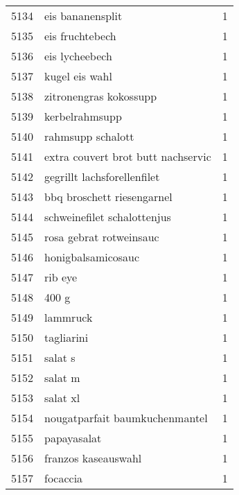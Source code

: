 \begin{tabular}{llr}
5134 &                                   eis bananensplit &      1 \\
5135 &                                    eis fruchtebech &      1 \\
5136 &                                     eis lycheebech &      1 \\
5137 &                                     kugel eis wahl &      1 \\
5138 &                             zitronengras kokossupp &      1 \\
5139 &                                     kerbelrahmsupp &      1 \\
5140 &                                  rahmsupp schalott &      1 \\
5141 &                 extra couvert brot butt nachservic &      1 \\
5142 &                        gegrillt lachsforellenfilet &      1 \\
5143 &                         bbq broschett riesengarnel &      1 \\
5144 &                        schweinefilet schalottenjus &      1 \\
5145 &                            rosa gebrat rotweinsauc &      1 \\
5146 &                                 honigbalsamicosauc &      1 \\
5147 &                                            rib eye &      1 \\
5148 &                                              400 g &      1 \\
5149 &                                           lammruck &      1 \\
5150 &                                         tagliarini &      1 \\
5151 &                                            salat s &      1 \\
5152 &                                            salat m &      1 \\
5153 &                                           salat xl &      1 \\
5154 &                     nougatparfait baumkuchenmantel &      1 \\
5155 &                                        papayasalat &      1 \\
5156 &                                franzos kaseauswahl &      1 \\
5157 &                                           focaccia &      1 \\

\end{tabular}
